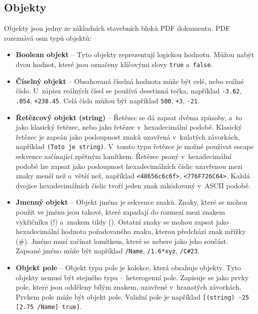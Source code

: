 \subsection*{Objekty}
Objekty jsou jedny ze základních stavebních bloků PDF dokumentu. PDF rozeznává
osm typů objektů:
\begin{itemize}
    \item \textbf{Boolean objekt} -- Tyto objekty reprezentují logickou hodnotu.
    Můžou nabýt dvou hodnot, které jsou označeny klíčovými slovy \texttt{true}
    a~\texttt{false}.
    
    \item \textbf{Číselný objekt} -- Obsahovaná číselná hodnota může být celé,
    nebo reálné číslo. U~zápisu reálných čísel se používá desetinná tečka,
    například \texttt{-3.62}, \texttt{.054}, \texttt{+238.45}. Celá čísla můžou
    být například \texttt{500}, \texttt{+3}, \texttt{-21}.
    
    \item \textbf{Řetězcový objekt (string)} -- Řetězec se dá zapsat dvěma způsoby,
    a~to jako klasický řetězec, nebo jako řetězec v~hexadecimální podobě. Klasický
    řetězec je zapsán jako posloupnost znaků uzavřená v~kulatých závorkách,
    například \texttt{(Toto je string)}. V~tomto typu řetězce je možné používat
    escape sekvence začínající zpětným lomítkem. Řetězec psaný v~hexadecimální
    podobě lze zapsat jako posloupnost hexadecimálních číslic uzavřenou mezi znaky
    menší než a~větší než, například \texttt{<48656c6c6f>}, \texttt{<776F726C64>}.
    Každá dvojice hexadecimálních číslic tvoří jeden znak zakódovaný v~ASCII
    podobě.
    
    \item \textbf{Jmenný objekt} -- Objekt jména je sekvence znaků. Znaky, které
    se mohou použít ve jménu jsou takové, které zapadají do rozmezí mezi znakem
    vykřičníku (!) a~znakem tildy (\texttildelow). Ostatní znaky se mohou zapsat
    jako hexadecimální hodnota požadovaného znaku, kterou předchází znak mřížky
    (\#). Jméno musí začínat lomítkem, které se nebere jako jeho součást. Zapsané
    jméno může být například \texttt{/Name}, \texttt{/1.6*xyz}, \texttt{/C\#23}.
    
    \item \textbf{Objekt pole} -- Objekt typu pole je kolekce, která obsahuje
    objekty. Tyto objekty nemusí být stejného typu -- heterogenní pole.
    Zapisuje se jako prvky pole, které jsou odděleny bílým znakem, uzavřené
    v~hranatých závorkách. Prvkem pole může být objekt pole. Validní pole je
    například \texttt{[(string) -25 [2.75 /Name] true]}.
    

\end{itemize}
